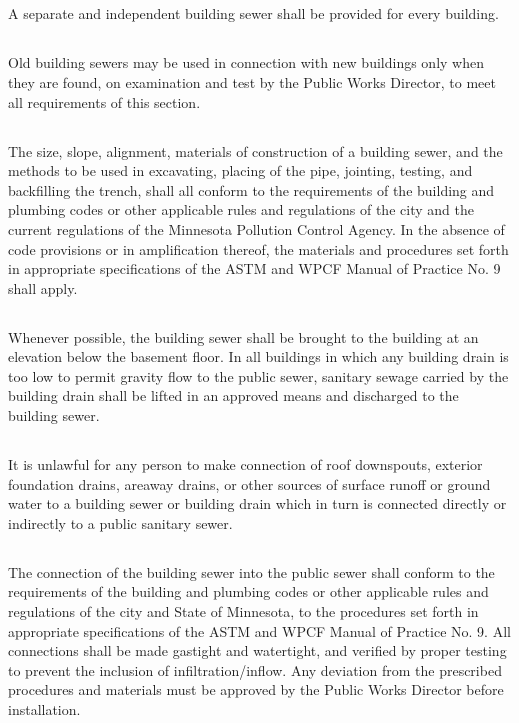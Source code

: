 \subsection{}
A separate and independent building sewer shall be provided for every building.
\subsection{}
Old building sewers may be used in connection with new buildings only when they are found, on examination and test by the Public Works Director, to meet all requirements of this section.
\subsection{}
The size, slope, alignment, materials of construction of a building sewer, and the methods to be used in excavating, placing of the pipe, jointing, testing, and backfilling the trench, shall all conform to the requirements of the building and plumbing codes or other applicable rules and regulations of the city and the current regulations of the Minnesota Pollution Control Agency.  In the absence of code provisions or in amplification thereof, the materials and procedures set forth in appropriate specifications of the ASTM and WPCF Manual of Practice No. 9 shall apply.
\subsection{}
Whenever possible, the building sewer shall be brought to the building at an elevation below the basement floor.  In all buildings in which any building drain is too low to permit gravity flow to the public sewer, sanitary sewage carried by the building drain shall be lifted in an approved means and discharged to the building sewer.
\subsection{}
It is unlawful for any person to make connection of roof downspouts, exterior foundation drains, areaway drains, or other sources of surface runoff or ground water to a building sewer or building drain which in turn is connected directly or indirectly to a public sanitary sewer.
\subsection{}
The connection of the building sewer into the public sewer shall conform to the requirements of the building and plumbing codes or other applicable rules and regulations of the city and State of Minnesota, to the procedures set forth in appropriate specifications of the ASTM and WPCF Manual of Practice No. 9.  All connections shall be made gastight and watertight, and verified by proper testing to prevent the inclusion of infiltration/inflow.  Any deviation from the prescribed procedures and materials must be approved by the Public Works Director before installation.
